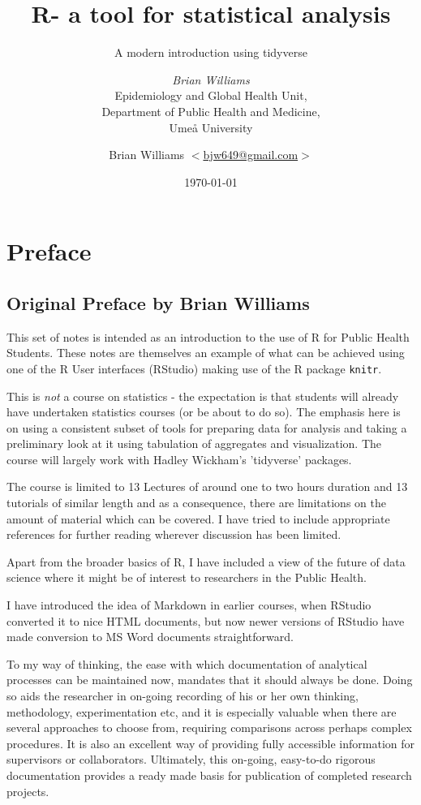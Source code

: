 \documentclass[titlepage]{book}
\title{\huge \textbf{ R- a tool for statistical analysis }\vspace{+1cm}  }
\subtitle{A modern introduction using tidyverse}
\author{{\LARGE \emph{Brian Williams}}\vspace{+1cm} \\
 Epidemiology and Global Health Unit,\\
 Department of Public Health and Medicine,\\
 Umeå University \vspace{+8cm}}
\date{\today}
\begin{document}





\chapter{Preface}

\section{Original Preface by Brian Williams}

\author{Brian Williams $<$\href{mailto:bjw649@gmail.com}%
{bjw649@gmail.com}$>$}

This set of notes is intended as an introduction to the use of R for Public Health Students.  These notes are themselves an example of what can be achieved using one of the R User interfaces (RStudio) making use of the R package \texttt{knitr}. 

This is \textsl{not} a course on statistics - the expectation is that students will already have undertaken statistics courses (or be about to do so).  The emphasis here is on using a consistent subset of tools for preparing data for analysis and taking a preliminary look at it using tabulation of aggregates and visualization. The course will largely work with Hadley Wickham's 'tidyverse' packages. 

The course is limited to 13 Lectures of around one to two hours duration and 13 tutorials of similar length and as a consequence, there are limitations on the amount of material which can be covered.  I have tried to include appropriate references for further reading wherever discussion has been limited. 

Apart from the broader basics of R, I have included a view of the future of data science where it might be of interest to researchers in the Public Health. 

I have introduced the idea of Markdown in earlier courses, when RStudio converted it to nice HTML documents, but now newer versions of RStudio have made conversion to MS Word documents straightforward. 

To my way of thinking, the ease with which documentation of analytical processes can be maintained now, mandates that it should always be done.  Doing so aids the researcher in on-going recording of his or her own thinking, methodology, experimentation etc, and it is especially valuable when there are several approaches to choose from, requiring comparisons across perhaps complex procedures.  It is also an excellent way of providing fully accessible information for supervisors or collaborators.  Ultimately, this on-going, easy-to-do rigorous documentation provides a ready made basis for publication of completed research projects.
\end{document}

